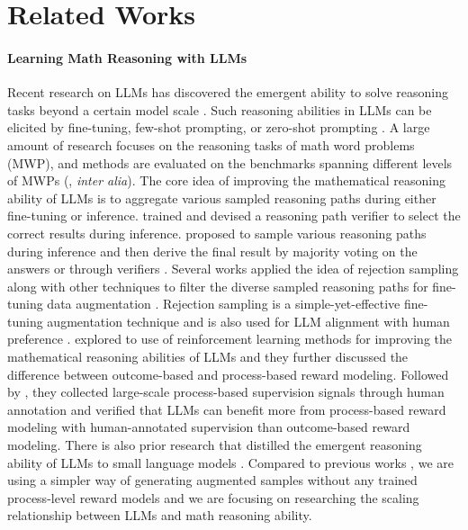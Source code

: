 \section{Related Works}

\paragraph{Learning Math Reasoning with LLMs} Recent research on LLMs has discovered the emergent ability to solve reasoning tasks beyond a certain model scale \citep{Wei2022EmergentAO}. Such reasoning abilities in LLMs can be elicited by fine-tuning, few-shot prompting, or zero-shot prompting  \citep{gsm8k,Wei2021FinetunedLM,nye2021work,Wei2022ChainOT,kojima2022large}. A large amount of research focuses on the reasoning tasks of math word problems (MWP), and methods are evaluated on the benchmarks spanning different levels of MWPs (\citet{koncel-kedziorski-etal-2016-mawps,patel-etal-2021-nlp,lan2021mwptoolkit,gsm8k,jie-etal-2022-learning,math401,fu2023chainofthought}, \textit{inter alia}). The core idea of improving the mathematical reasoning ability of LLMs is to aggregate various sampled reasoning paths during either fine-tuning or inference. 
\citet{gsm8k} trained and devised a reasoning path verifier to select the correct results during inference. \citet{wang2023selfconsistency} proposed to sample various reasoning paths during inference and then derive the final result by majority voting on the answers or through verifiers \citep{li-etal-2023-making}. Several works applied the idea of rejection sampling along with other techniques to filter the diverse sampled reasoning paths for fine-tuning data augmentation \citep{huang2022large,zelikman2022star,ni2023learning,zhu-etal-2023-solving}. Rejection sampling is a simple-yet-effective fine-tuning augmentation technique and is also used for LLM alignment with human preference \citep{bai2022constitutional,yuan2023rrhf,dong2023raft,llama2,song2023preference}. 
\citet{uesato2022solving} explored to use of reinforcement learning methods for improving the mathematical reasoning abilities of LLMs and they further discussed the difference between outcome-based and process-based reward modeling. Followed by \citet{lightman2023lets}, they collected large-scale process-based supervision signals through human annotation and verified that LLMs can benefit more from process-based reward modeling with human-annotated supervision than outcome-based reward modeling. There is also prior research that distilled the emergent reasoning ability of LLMs to small language models \citep{fu2023specializing,shridhar-etal-2023-distilling}. Compared to previous works \citep{zelikman2022star,uesato2022solving,zhu-etal-2023-solving,ni2023learning}, we are using a simpler way of generating augmented samples without any trained process-level reward models and we are focusing on researching the scaling relationship between LLMs and math reasoning ability.

